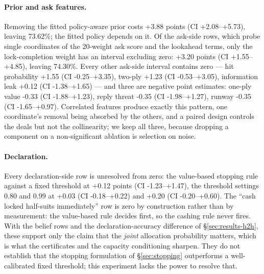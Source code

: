 \documentclass[11pt]{article}
\theoremstyle{definition}
\newcommand{\numAblPrior}{+3.88}
\newcommand{\numAblPriorCI}{+2.08--+5.73}
\newcommand{\numAblStop}{+0.12}
\newcommand{\numAblStopCI}{-1.23--+1.47}
\newcommand{\numAblTwoPly}{+1.23}
\newcommand{\numAblTwoPlyCI}{-0.53--+3.05}
\newcommand{\numAblLockWeight}{+3.20}
\newcommand{\numAblLockWeightCI}{+1.55--+4.85}
\newcommand{\numAskFeats}{20}
\newcommand{\numAblPriorAbs}{73.62}
\newcommand{\numAblLockWeightAbs}{74.30}
\newcommand{\numAblThreat}{-0.35}
\newcommand{\numAblThreatCI}{-1.98--+1.27}
\newcommand{\numAblLeak}{+0.12}
\newcommand{\numAblLeakCI}{-1.38--+1.65}
\newcommand{\numAblValue}{-0.33}
\newcommand{\numAblValueCI}{-1.88--+1.23}
\newcommand{\numAblRunway}{-0.35}
\newcommand{\numAblRunwayCI}{-1.65--+0.97}
\newcommand{\numAblHitWeight}{+1.55}
\newcommand{\numAblHitWeightCI}{-0.25--+3.35}
\newcommand{\numAblDeclEighty}{+0.03}
\newcommand{\numAblDeclEightyCI}{-0.18--+0.22}
\newcommand{\numAblDeclNinetyNine}{+0.20}
\newcommand{\numAblDeclNinetyNineCI}{-0.20--+0.60}
\begin{document}
\paragraph{Prior and ask features.}
Removing the fitted policy-aware prior costs \numAblPrior{} points (CI
\numAblPriorCI{}), leaving \numAblPriorAbs\%; the fitted policy depends on it. Of
the ask-side rows, which probe single coordinates of the \numAskFeats-weight ask
score and the lookahead terms, only the lock-completion weight has an interval
excluding zero: \numAblLockWeight{} points (CI \numAblLockWeightCI{}), leaving
\numAblLockWeightAbs\%. Every other ask-side interval contains zero --- hit
probability \numAblHitWeight{} (CI \numAblHitWeightCI{}), two-ply
\numAblTwoPly{} (CI \numAblTwoPlyCI{}), information leak \numAblLeak{} (CI
\numAblLeakCI{}) --- and three are negative point estimates: one-ply value
\numAblValue{} (CI \numAblValueCI{}), reply threat \numAblThreat{} (CI
\numAblThreatCI{}), runway \numAblRunway{} (CI \numAblRunwayCI{}). Correlated
features produce exactly this pattern, one coordinate's removal being absorbed by
the others, and a paired design controls the deals but not the collinearity; we
keep all three, because dropping a component on a non-significant ablation is
selection on noise.

\paragraph{Declaration.}
Every declaration-side row is unresolved from zero: the value-based stopping rule
against a fixed threshold at \numAblStop{} points (CI \numAblStopCI{}), the
threshold settings $0.80$ and $0.99$ at \numAblDeclEighty{} (CI
\numAblDeclEightyCI{}) and \numAblDeclNinetyNine{} (CI \numAblDeclNinetyNineCI{}).
The ``cash locked half-suits immediately'' row is zero by construction rather than
by measurement: the value-based rule decides first, so the cashing rule never
fires. With the belief rows and the declaration-accuracy difference of
\S\ref{sec:results-h2h}, these support only the claim that the \emph{joint}
allocation probability matters, which is what the certificates and the capacity
conditioning sharpen. They do not establish that the stopping formulation of
\S\ref{sec:stopping} outperforms a well-calibrated fixed threshold; this
experiment lacks the power to resolve that.
\end{document}
